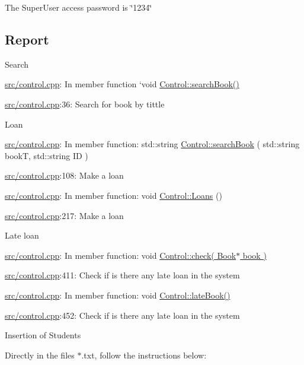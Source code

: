 


\begin{DoxyItemize}
\item The Super\+User access password is \char`\"{}1234\char`\"{}
\end{DoxyItemize}

\subsection*{Report}


\begin{DoxyItemize}
\item Search

\hyperlink{control_8cpp}{src/control.\+cpp}\+: In member function ‘void \hyperlink{classControl_a8b6c2e30e71b54786b3ec01e8524076f}{Control\+::search\+Book()}\textquotesingle{}

\hyperlink{control_8cpp}{src/control.\+cpp}\+:36\+: Search for book by tittle
\item Loan

\hyperlink{control_8cpp}{src/control.\+cpp}\+: In member function\+: \textquotesingle{}std\+::string \hyperlink{classControl_a7719518366f488614467555e53a6d0c2}{Control\+::search\+Book} ( std\+::string bookT, std\+::string ID )\textquotesingle{}

\hyperlink{control_8cpp}{src/control.\+cpp}\+:108\+: Make a loan

\hyperlink{control_8cpp}{src/control.\+cpp}\+: In member function\+: \textquotesingle{}void \hyperlink{classControl_ad413782c762539562d2ff9401a54eab3}{Control\+::\+Loans} ()\textquotesingle{}

\hyperlink{control_8cpp}{src/control.\+cpp}\+:217\+: Make a loan
\item Late loan

\hyperlink{control_8cpp}{src/control.\+cpp}\+: In member function\+: \textquotesingle{}void \hyperlink{classControl_a234ad2973e4ad1e4cb9099f75dbdb05f}{Control\+::check( Book$\ast$ book )}\textquotesingle{}

\hyperlink{control_8cpp}{src/control.\+cpp}\+:411\+: Check if is there any late loan in the system

\hyperlink{control_8cpp}{src/control.\+cpp}\+: In member function\+: \textquotesingle{}void \hyperlink{classControl_a94a103e37a13e4bbf4ca7c4a979306bf}{Control\+::late\+Book()}\textquotesingle{}

\hyperlink{control_8cpp}{src/control.\+cpp}\+:452\+: Check if is there any late loan in the system
\item Insertion of Students

Directly in the files $\ast$.txt, follow the instructions below\+:
\end{DoxyItemize}


